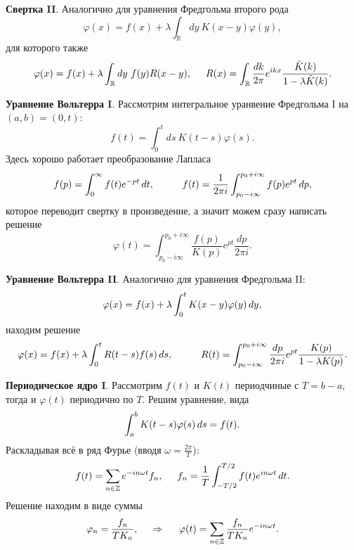 \textbf{Свертка II}. Аналогично для уравнения Фредгольма второго рода
\begin{equation}
	\varphi(x) = f(x) + \lambda \int_{\mathbb{R}} dy\ K(x-y) \varphi(y),
\end{equation}
для которого также
\begin{equation}
	\varphi(x) = f(x) + \lambda \int_{\mathbb{R}} dy\ f(y) R(x-y),
	\hspace{5 mm} 
	R(x) = \int_{\mathbb{R}} \frac{dk}{2\pi} e^{ik x} \frac{\tilde{K}(k)}{1-\lambda \tilde{K}(k)}.
\end{equation}

\textbf{Уравнение Вольтерра I}. Рассмотрим интегральное уранвение Фредгольма I на $(a,b) = (0, t)$:
\begin{equation*}
	f(t) = \int_{0}^{t} ds\ K(t-s) \varphi(s).
\end{equation*}
Здесь хорошо работает преобразование Лапласа 
\begin{equation*}
	f(p) = \int_{0}^{\infty}  f(t) e^{-pt} \d t,
	\hspace{10 mm} 
	f(t) = \frac{1}{2 \pi i}\int_{p_0 - i \infty}^{p_0 + i \infty} f(p) e^{pt} \d p,
\end{equation*}
которое переводит свертку в произведение, а значит можем сразу написать решение
\begin{equation}
	\varphi(t)  = \int_{p_0 - i \infty}^{p_0 + i \infty} \frac{f(p)}{K(p)} e^{pt} \frac{dp}{2\pi i}.
\end{equation}

\textbf{Уравнение Вольтерра II}.
Аналогично для уравнения Фредгольма II:
\begin{equation}
	\varphi(x) = f(x) + \lambda \int_{0}^{t} K(x-y) \varphi(y) \, d y,
\end{equation}
находим решение
\begin{equation*}
	\varphi(x) = f(x) + \lambda \int_{0}^{t} R(t-s) f(s) \d s,
	\hspace{10 mm} 
	R(t) = \int_{p_0 - i \infty}^{p_0 + i \infty} \frac{dp}{2\pi i} e^{pt} \frac{K(p)}{1-\lambda K(p)}.
\end{equation*}



\textbf{Периодическое ядро I}. Рассмотрим $f(t)$ и $K(t)$ периодчиные с $T = b-a$, тогда и $\varphi(t)$ периодично по $T$. Решим уравнение, вида
\begin{equation}
	\int_{a}^{b} K(t-s) \varphi(s) \, d s = f(t).
\end{equation}
Раскладывая всё в ряд Фурье (вводя $\omega = \frac{2\pi}{T}$):
\begin{equation*}
	f(t) = \sum_{n \in \mathbb{Z}} e^{-in \omega t} f_n,
	\hspace{5 mm} f_n = \frac{1}{T} \int_{-T/2}^{T/2} f(t) e^{i n \omega t} \, d t.
\end{equation*}
Решение находим в виде суммы
\begin{equation}
	\varphi_n = \frac{f_n}{T K_n},
	\hspace{0.5cm} \Rightarrow \hspace{0.5cm}
	\varphi(t) = \sum_{n \in \mathbb{Z}} \frac{f_n}{T K_n} e^{-i n \omega t}.
\end{equation}

